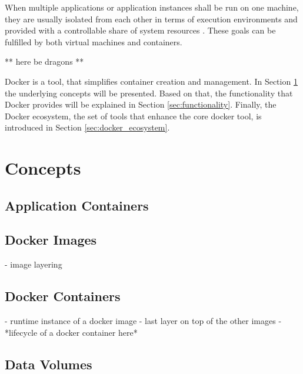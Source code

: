   When multiple applications or application instances shall be run on one machine, they are usually isolated from each other in terms of execution environments and provided with a controllable share of system resources \cite{Felter2014Updated}. These goals can be fulfilled by both virtual machines and containers.

  ** here be dragons **

  Docker is a tool, that simplifies container creation and management. In Section \ref{sec:concepts} the underlying concepts will be presented. Based on that, the functionality that Docker provides will be explained in Section \ref{sec:functionality}. Finally, the Docker ecosystem, \ie the set of tools that enhance the core docker tool, is introduced in Section \ref{sec:docker_ecosystem}.

\section{Concepts} %
\label{sec:concepts}

  \subsection{Application Containers} %
  \label{sub:application_containers}
  

  \subsection{Docker Images} %
  \label{sub:docker_images}
    - image layering
    \cite{Docker????Docker}

  \subsection{Docker Containers} %
  \label{sub:docker_containers}
    - runtime instance of a docker image
    - last layer on top of the other images
    - *lifecycle of a docker container here*

  \subsection{Data Volumes} %
  \label{sub:data_volumes}
  

